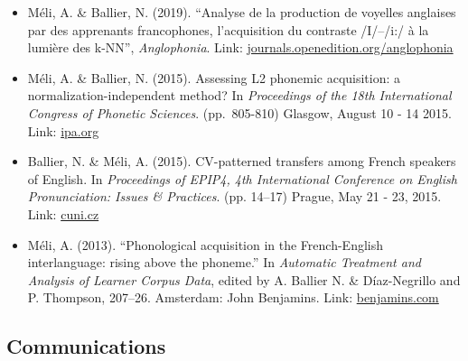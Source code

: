 \documentclass[
  10pt,
]{article}
\begin{document}
\begin{itemize}
\item
  Méli, A. \& Ballier, N. (2019). ``Analyse de la production de voyelles anglaises par des apprenants francophones, l'acquisition du contraste /I/--/i:/ à la lumière des k-NN'', \emph{Anglophonia}. Link: \href{https://journals.openedition.org/anglophonia/2109}{journals.openedition.org/anglophonia}
\item
  Méli, A. \& Ballier, N. (2015). Assessing L2 phonemic acquisition: a normalization-independent method? In \emph{Proceedings of the 18th International Congress of Phonetic Sciences}. (pp.~805-810) Glasgow, August 10 - 14 2015. Link: \href{https://www.internationalphoneticassociation.org/icphs-proceedings/ICPhS2015/Papers/ICPHS0805.pdf}{ipa.org}
\item
  Ballier, N. \& Méli, A. (2015). CV-patterned transfers among French speakers of English. In \emph{Proceedings of EPIP4, 4th International Conference on English Pronunciation: Issues \& Practices}. (pp.
  14--17) Prague, May 21 - 23, 2015. Link: \href{https://fu.ff.cuni.cz/epip4/docs/EPIP4-Proceedings.pdf}{cuni.cz}
\item
  Méli, A. (2013). ``Phonological acquisition in the French-English interlanguage: rising above the phoneme.'' In \emph{Automatic Treatment and Analysis of Learner Corpus Data}, edited by A. Ballier N. \& Díaz-Negrillo and P. Thompson, 207--26. Amsterdam: John Benjamins. Link: \href{https://benjamins.com/catalog/scl.59.13mel}{benjamins.com}
\end{itemize}

\hypertarget{communications}{%
\subsection{Communications}\label{communications}}
\end{document}
